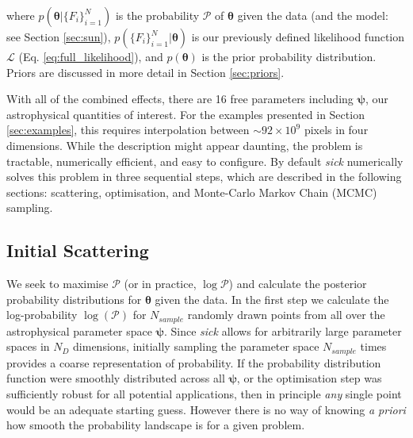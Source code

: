 \documentclass{aastex}
\newcommand{\sick}{\textit{sick}}
\begin{document}
\noindent{}where $p(\bm{\theta}|\{F_i\}_{i=1}^{N})$ is the probability $\mathcal{P}$ of $\bm{\theta}$ given the data (and the model: see Section \ref{sec:sun}), $p(\{F_i\}_{i=1}^{N}|\bm{\theta})$ is our previously defined likelihood function $\mathcal{L}$ (Eq. \ref{eq:full_likelihood}), and $p(\bm{\theta})$ is the prior probability distribution. Priors are discussed in more detail in Section \ref{sec:priors}. 

%


With all of the combined effects, there are 16 free parameters including $\bm{\psi}$, our astrophysical quantities of interest. For the examples presented in Section \ref{sec:examples}, this requires interpolation between $\sim{}92\times10^9$ pixels in four dimensions. While the description might appear daunting, the problem is tractable, numerically efficient, and easy to configure. By default \sick{} numerically solves this problem in three sequential steps, which are described in the following sections: scattering, optimisation, and Monte-Carlo Markov Chain (MCMC) sampling.


\subsection{Initial Scattering}
\label{sec:scattering}

We seek to maximise $\mathcal{P}$ (or in practice, $\log\mathcal{P}$) and calculate the posterior probability distributions for $\bm{\theta}$ given the data. In the first step we calculate the log-probability $\log{(\mathcal{P})}$ for $N_{sample}$ randomly drawn points from all over the astrophysical parameter space $\bm{\psi}$. Since \sick{} allows for arbitrarily large parameter spaces in $N_{D}$ dimensions, initially sampling the parameter space $N_{sample}$ times provides a coarse representation of probability. If the probability distribution function were smoothly distributed across all $\bm{\psi}$, or the optimisation step was sufficiently robust for all potential applications, then in principle \textit{any} single point would be an adequate starting guess. However there is no way of knowing \textit{a priori} how smooth the probability landscape is for a given problem. 
\end{document}
